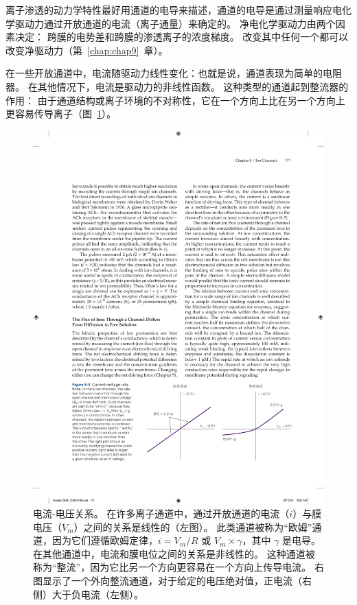 离子渗透的动力学特性最好用通道的电导来描述，通道的电导是通过测量响应电化学驱动力通过开放通道的电流（离子通量）来确定的。
净电化学驱动力由两个因素决定：
跨膜的电势差和跨膜的渗透离子的浓度梯度。
改变其中任何一个都可以改变净驱动力（第~\ref{chap:chap9}~章）。


在一些开放通道中，电流随驱动力线性变化：也就是说，通道表现为简单的电阻器。
在其他情况下，电流是驱动力的非线性函数。
这种类型的通道起到整流器的作用：
由于通道结构或离子环境的不对称性，它在一个方向上比在另一个方向上更容易传导离子（图~\ref{fig:8_3}）。


\begin{figure}[htbp]
	\centering
	\includegraphics[width=0.95\linewidth]{chap08/fig_8_3}
	\caption{电流-电压关系。
		在许多离子通道中，通过开放通道的电流（$i$）与膜电压（$V_m$）之间的关系是线性的（左图）。
		此类通道被称为“欧姆”通道，因为它们遵循欧姆定律，$i = V_m /R$ 或 $ V_m \times \gamma $，其中 $\gamma$ 是电导。
		在其他通道中，电流和膜电位之间的关系是非线性的。
		这种通道被称为“整流”，因为它比另一个方向更容易在一个方向上传导电流。
		右图显示了一个外向整流通道，对于给定的电压绝对值，正电流（右侧）大于负电流（左侧）。}
	\label{fig:8_3}
\end{figure}


